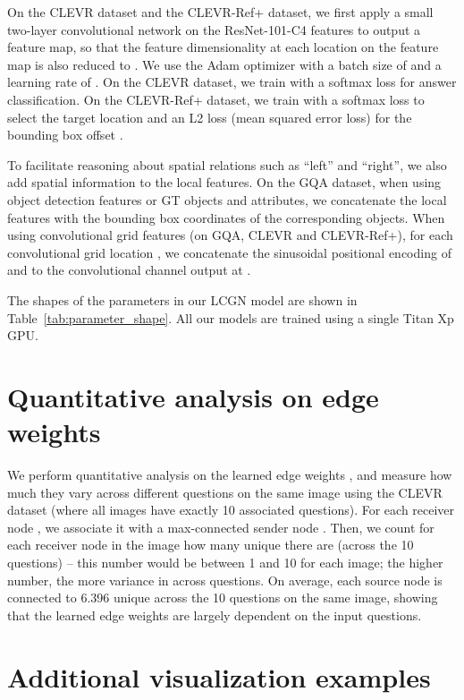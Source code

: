 \documentclass[10pt,twocolumn,letterpaper]{article}
\begin{document}
On the CLEVR dataset and the CLEVR-Ref+ dataset, we first apply a small two-layer convolutional network on the ResNet-101-C4 features to output a  feature map, so that the feature dimensionality at each location on the feature map is also reduced to . We use the Adam optimizer \cite{kingma2014adam} with a batch size of  and a learning rate of . On the CLEVR dataset, we train with a softmax loss for answer classification. On the CLEVR-Ref+ dataset, we train with a softmax loss to select the target location  and an L2 loss (\ie mean squared error loss) for the bounding box offset .

To facilitate reasoning about spatial relations such as ``left'' and ``right'', we also add spatial information to the local features. On the GQA dataset, when using object detection features or GT objects and attributes, we concatenate the local features with the bounding box coordinates of the corresponding objects. When using convolutional grid features (on GQA, CLEVR and CLEVR-Ref+), for each convolutional grid location , we concatenate the sinusoidal positional encoding \cite{vaswani2017attention} of  and  to the convolutional channel output at .

The shapes of the parameters in our LCGN model are shown in Table~\ref{tab:parameter_shape}. All our models are trained using a single Titan Xp GPU.

\section{Quantitative analysis on edge weights}

We perform quantitative analysis on the learned edge weights , and measure how much they vary across different questions on the same image using the CLEVR dataset (where all images have exactly 10 associated questions). For each receiver node , we associate it with a max-connected sender node . Then, we count for each receiver node  in the image how many unique  there are (across the 10 questions) -- this number would be between 1 and 10 for each image; the higher number, the more variance in  across questions. On average, each source node  is connected to 6.396 unique  across the 10 questions on the same image, showing that the learned edge weights  are largely dependent on the input questions.

\section{Additional visualization examples}
\end{document}
